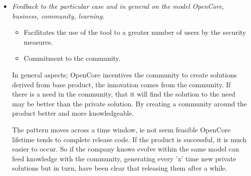 \documentclass[11pt]{scrartcl}
\begin{document}
\begin{itemize}
\item \emph{Feedback to the particular case and in general on the model OpenCore, business, community, learning.}

    \begin{itemize}
        \item Facilitates the use of the tool to a greater number of users by the security measures.
        \item Commitment to the community.
    \end{itemize}

    \par In general aspects; OpenCore incentives the community to create solutions derived from base product, the innovation comes from the community. If there is a need in the community, that it will find the solution to the need may be better than the private solution. By creating a community around the product better and more knowledgeable.

    \par The pattern moves across a time window, ie not seem feasible OpenCore lifetime tends to complete release code. If the product is successful, it is much easier to occur. So if the company knows evolve within the same model can feed knowledge with the community, generating every 'x' time new private solutions but in turn, have been clear that releasing them after a while.

\end{itemize}
\end{document}
